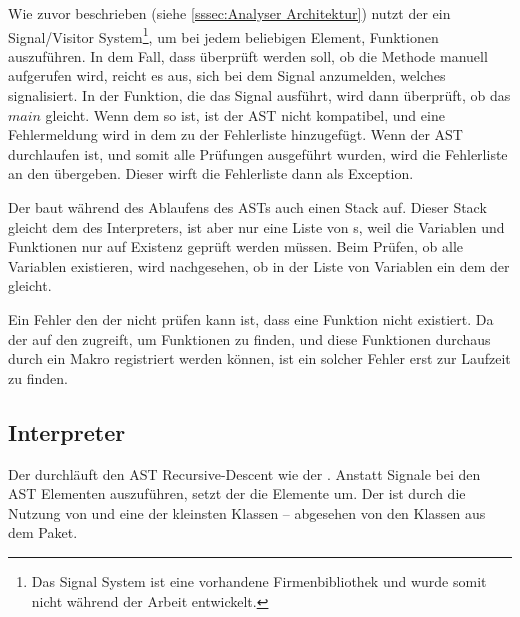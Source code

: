 {      Wie zuvor beschrieben (siehe \autoref{sssec:Analyser Architektur}) nutzt der  ein Signal/Visitor System\footnote{
        Das Signal System ist eine vorhandene Firmenbibliothek und wurde somit nicht während der Arbeit entwickelt.
      }, um bei jedem beliebigen Element, Funktionen auszuführen. In dem Fall, dass überprüft werden soll, ob die  Methode manuell aufgerufen wird, reicht es aus, sich bei dem Signal anzumelden, welches  signalisiert. In der Funktion, die das Signal ausführt, wird dann überprüft, ob das  \myRIn$main$ gleicht. Wenn dem so ist, ist der AST nicht kompatibel, und eine Fehlermeldung wird in dem  zu der Fehlerliste hinzugefügt. Wenn der AST durchlaufen ist, und somit alle Prüfungen ausgeführt wurden, wird die Fehlerliste an den  übergeben. Dieser wirft die Fehlerliste dann als Exception.

      Der  baut während des Ablaufens des ASTs auch einen Stack auf. Dieser Stack gleicht dem des Interpreters, ist aber nur eine Liste von s, weil die Variablen und Funktionen nur auf Existenz geprüft werden müssen. Beim Prüfen, ob alle Variablen existieren, wird nachgesehen, ob in der Liste von Variablen ein  dem der  gleicht.

      Ein Fehler den der  nicht prüfen kann ist, dass eine Funktion nicht existiert. Da der  auf den  zugreift, um Funktionen zu finden, und diese Funktionen durchaus durch ein Makro registriert werden können, ist ein solcher Fehler erst zur Laufzeit zu finden.

  \subsection{Interpreter}
  \label{ssec:Interpreter}
    Der  durchläuft den AST Recursive-Descent wie der . Anstatt Signale bei den AST Elementen auszuführen, setzt der  die Elemente um. Der  ist durch die Nutzung von  und  eine der kleinsten Klassen -- abgesehen von den Klassen aus dem  Paket.

}
